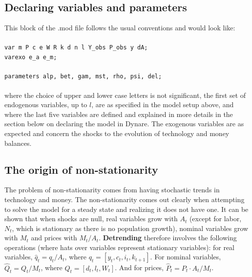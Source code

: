 \subsection{Declaring variables and parameters}
This block of the .mod file follows the usual conventions and would look like:\\
\\
\texttt{var m P c e W R k d n l Y\_obs P\_obs y dA; \\
varexo e\_a e\_m;\\
\\
parameters alp, bet, gam, mst, rho, psi, del;}\\
\\
where the choice of upper and lower case letters is not significant, the first set of endogenous variables, up to $l$, are as specified in the model setup above, and where the last five variables are defined and explained in more details in the section below on declaring the model in Dynare. The exogenous variables are as expected and concern the shocks to the evolution of technology and money balances. \\

\subsection{The origin of non-stationarity} \label{sec:nonstat}
The problem of non-stationarity comes from having stochastic trends in technology and money. The non-stationarity comes out clearly when attempting to solve the model for a steady state and realizing it does not have one. It can be shown that when shocks are null, real variables grow with $A_t$ (except for labor, $N_t$, which is stationary as there is no population growth), nominal variables grow with $M_t$ and prices with $M_t/A_t$. \textbf{Detrending} therefore involves the following operations (where hats over variables represent stationary variables): for real variables, $\hat q_t=q_t/A_t$, where $q_t = [y_t, c_t, i_t, k_{t+1} ]$. For nominal variables, $\hat{Q}_t = Q_t/M_t$, where $Q_t = [ d_t, l_t, W_t ]$. And for prices, $\hat P_t = P_t \cdot A_t / M_t$. \\

